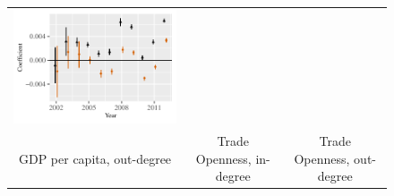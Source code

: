 \documentclass[reqno,onecolumn,letterpaper,12pt]{article}
\begin{document}
\begin{figure}[!h]
\begin{tabular}{@{\hskip -.05cm}c@{\hskip -.2cm}c@{\hskip -.2cm}c}
\includegraphics[height=.165\textheight, clip=true, trim=.5cm .5cm 0cm .1cm]{figures/main_rl_plots/Dest_GDPpc.pdf} \\

GDP per capita,  out-degree &
Trade Openness, in-degree&
Trade Openness,  out-degree \\


\end{tabular}
\end{figure}
\end{document}
